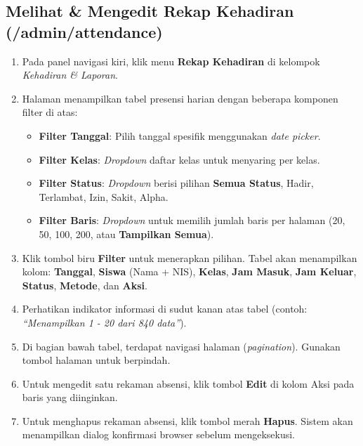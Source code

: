 \subsection{Melihat \& Mengedit Rekap Kehadiran (/admin/attendance)}
\begin{enumerate}
    \item Pada panel navigasi kiri, klik menu \textbf{Rekap Kehadiran} di kelompok \textit{Kehadiran \& Laporan}.
    \item Halaman menampilkan tabel presensi harian dengan beberapa komponen filter di atas:
    \begin{itemize}
        \item \textbf{Filter Tanggal}: Pilih tanggal spesifik menggunakan \textit{date picker}.
        \item \textbf{Filter Kelas}: \textit{Dropdown} daftar kelas untuk menyaring per kelas.
        \item \textbf{Filter Status}: \textit{Dropdown} berisi pilihan \textbf{Semua Status}, Hadir, Terlambat, Izin, Sakit, Alpha.
        \item \textbf{Filter Baris}: \textit{Dropdown} untuk memilih jumlah baris per halaman (20, 50, 100, 200, atau \textbf{Tampilkan Semua}).
    \end{itemize}
    \item Klik tombol biru \textbf{Filter} untuk menerapkan pilihan. Tabel akan menampilkan kolom: \textbf{Tanggal}, \textbf{Siswa} (Nama + NIS), \textbf{Kelas}, \textbf{Jam Masuk}, \textbf{Jam Keluar}, \textbf{Status}, \textbf{Metode}, dan \textbf{Aksi}.
    \item Perhatikan indikator informasi di sudut kanan atas tabel (contoh: \textit{``Menampilkan 1 - 20 dari 840 data''}).
    \item Di bagian bawah tabel, terdapat navigasi halaman (\textit{pagination}). Gunakan tombol halaman untuk berpindah.
    \item Untuk mengedit satu rekaman absensi, klik tombol \textbf{Edit} di kolom Aksi pada baris yang diinginkan.
    \item Untuk menghapus rekaman absensi, klik tombol merah \textbf{Hapus}. Sistem akan menampilkan dialog konfirmasi browser sebelum mengeksekusi.
\end{enumerate}

